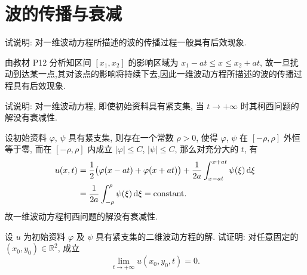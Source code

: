 \section{波的传播与衰减}

\begin{exercise}
  试说明: 对一维波动方程所描述的波的传播过程一般具有后效现象.
\end{exercise}

\begin{solve}
  由教材 P12 分析知区间 $[x_1,x_2]$ 的影响区域为 $x_1-at\leq x\leq x_2+at$,
  故一旦扰动到达某一点,其对该点的影响将持续下去,因此一维波动方程所描述的波的传播过程具有后效现象.
\end{solve}


\begin{exercise}
  试说明: 对一维波动方程, 即使初始资料具有紧支集,
  当 $t\to +\infty$ 时其柯西问题的解没有衰减性.
\end{exercise}

\begin{solve}
  设初始资料 $\varphi$, $\psi$ 具有紧支集, 则存在一个常数 $\rho>0$,
  使得 $\varphi$, $\psi$ 在 $[-\rho,\rho]$ 外恒等于零,
  而在 $[-\rho,\rho]$ 内成立 $|\varphi|\leq C$, $|\psi|\leq C$, 那么对充分大的 $t$, 有
  \begin{align*}
    u(x,t)
    & = \frac{1}{2}\bigl(\varphi(x-at)
        +\varphi(x+at)\bigr)+\frac{1}{2a}\int_{x-at}^{x+at}\psi(\xi)\mathop{}\!\mathrm{d}\xi \\
    & = \frac{1}{2a}\int_{-\rho}^{\rho}\psi(\xi)\mathop{}\!\mathrm{d}\xi= \text{constant}.
  \end{align*}
  故一维波动方程柯西问题的解没有衰减性.
\end{solve}


\begin{exercise}
  设 $u$ 为初始资料 $\varphi$ 及 $\psi$ 具有紧支集的二维波动方程的解.
  试证明: 对任意固定的 $(x_0,y_0)\in \mathbb{R}^2$, 成立
  \[\lim_{t\to+\infty} u(x_0,y_0,t) = 0.\]
\end{exercise}

